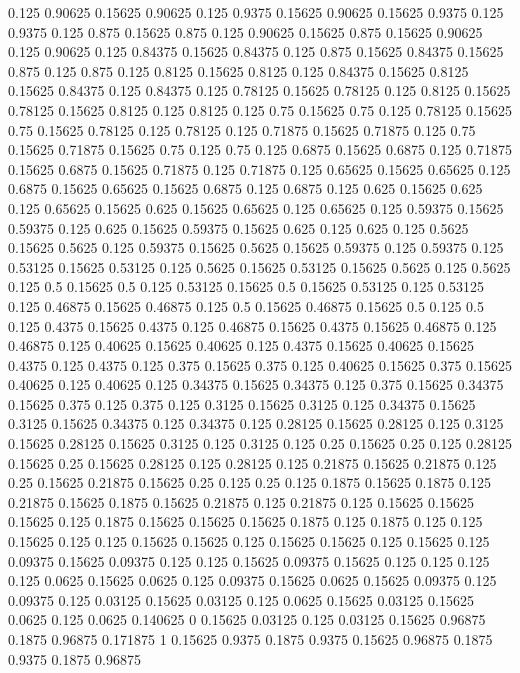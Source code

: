 0.125 0.90625
0.15625 0.90625
0.125 0.9375
0.15625 0.90625
0.15625 0.9375
0.125 0.9375
0.125 0.875
0.15625 0.875
0.125 0.90625
0.15625 0.875
0.15625 0.90625
0.125 0.90625
0.125 0.84375
0.15625 0.84375
0.125 0.875
0.15625 0.84375
0.15625 0.875
0.125 0.875
0.125 0.8125
0.15625 0.8125
0.125 0.84375
0.15625 0.8125
0.15625 0.84375
0.125 0.84375
0.125 0.78125
0.15625 0.78125
0.125 0.8125
0.15625 0.78125
0.15625 0.8125
0.125 0.8125
0.125 0.75
0.15625 0.75
0.125 0.78125
0.15625 0.75
0.15625 0.78125
0.125 0.78125
0.125 0.71875
0.15625 0.71875
0.125 0.75
0.15625 0.71875
0.15625 0.75
0.125 0.75
0.125 0.6875
0.15625 0.6875
0.125 0.71875
0.15625 0.6875
0.15625 0.71875
0.125 0.71875
0.125 0.65625
0.15625 0.65625
0.125 0.6875
0.15625 0.65625
0.15625 0.6875
0.125 0.6875
0.125 0.625
0.15625 0.625
0.125 0.65625
0.15625 0.625
0.15625 0.65625
0.125 0.65625
0.125 0.59375
0.15625 0.59375
0.125 0.625
0.15625 0.59375
0.15625 0.625
0.125 0.625
0.125 0.5625
0.15625 0.5625
0.125 0.59375
0.15625 0.5625
0.15625 0.59375
0.125 0.59375
0.125 0.53125
0.15625 0.53125
0.125 0.5625
0.15625 0.53125
0.15625 0.5625
0.125 0.5625
0.125 0.5
0.15625 0.5
0.125 0.53125
0.15625 0.5
0.15625 0.53125
0.125 0.53125
0.125 0.46875
0.15625 0.46875
0.125 0.5
0.15625 0.46875
0.15625 0.5
0.125 0.5
0.125 0.4375
0.15625 0.4375
0.125 0.46875
0.15625 0.4375
0.15625 0.46875
0.125 0.46875
0.125 0.40625
0.15625 0.40625
0.125 0.4375
0.15625 0.40625
0.15625 0.4375
0.125 0.4375
0.125 0.375
0.15625 0.375
0.125 0.40625
0.15625 0.375
0.15625 0.40625
0.125 0.40625
0.125 0.34375
0.15625 0.34375
0.125 0.375
0.15625 0.34375
0.15625 0.375
0.125 0.375
0.125 0.3125
0.15625 0.3125
0.125 0.34375
0.15625 0.3125
0.15625 0.34375
0.125 0.34375
0.125 0.28125
0.15625 0.28125
0.125 0.3125
0.15625 0.28125
0.15625 0.3125
0.125 0.3125
0.125 0.25
0.15625 0.25
0.125 0.28125
0.15625 0.25
0.15625 0.28125
0.125 0.28125
0.125 0.21875
0.15625 0.21875
0.125 0.25
0.15625 0.21875
0.15625 0.25
0.125 0.25
0.125 0.1875
0.15625 0.1875
0.125 0.21875
0.15625 0.1875
0.15625 0.21875
0.125 0.21875
0.125 0.15625
0.15625 0.15625
0.125 0.1875
0.15625 0.15625
0.15625 0.1875
0.125 0.1875
0.125 0.125
0.15625 0.125
0.125 0.15625
0.15625 0.125
0.15625 0.15625
0.125 0.15625
0.125 0.09375
0.15625 0.09375
0.125 0.125
0.15625 0.09375
0.15625 0.125
0.125 0.125
0.125 0.0625
0.15625 0.0625
0.125 0.09375
0.15625 0.0625
0.15625 0.09375
0.125 0.09375
0.125 0.03125
0.15625 0.03125
0.125 0.0625
0.15625 0.03125
0.15625 0.0625
0.125 0.0625
0.140625 0
0.15625 0.03125
0.125 0.03125
0.15625 0.96875
0.1875 0.96875
0.171875 1
0.15625 0.9375
0.1875 0.9375
0.15625 0.96875
0.1875 0.9375
0.1875 0.96875
